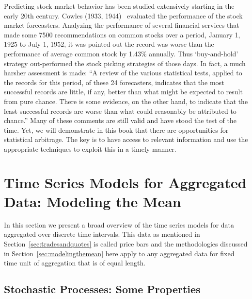 Predicting stock market behavior has been studied extensively starting in the early 20th century. Cowles (1933, 1944)~\cite{cow2,cow1} evaluated the performance of the stock market forecasters. Analyzing the performance of several financial services that made some 7500 recommendations on common stocks over a period, January 1, 1925 to July 1, 1952, it was pointed out the record was worse than the performance of average common stock by 1.43\% annually. Thus `buy-and-hold' strategy out-performed the stock picking strategies of those days. In fact, a much harsher assessment is made: ``A review of the various statistical tests, applied to the records for this period, of these 24 forecasters, indicates that the most successful records are little, if any, better than what might be expected to result from pure chance. There is some evidence, on the other hand, to indicate that the least successful records are worse than what could reasonably be attributed to chance.'' Many of these comments are still valid and have stood the test of the time. Yet, we will demonstrate in this book that there are opportunities for statistical arbitrage. The key is to have access to relevant information and use the appropriate techniques to exploit this in a timely manner. 


\section{Time Series Models for Aggregated Data: Modeling the Mean \label{sec:modelingthemean}}

In this section we present a broad overview of the time series models for data aggregated over discrete time intervals. This data as mentioned in Section~\ref{sec:tradesandquotes} is called price bars and the methodologies discussed in Section~\ref{sec:modelingthemean} here apply to any aggregated data for fixed time unit of aggregation that is of equal length. 

\subsection{Stochastic Processes: Some Properties} \hfill

